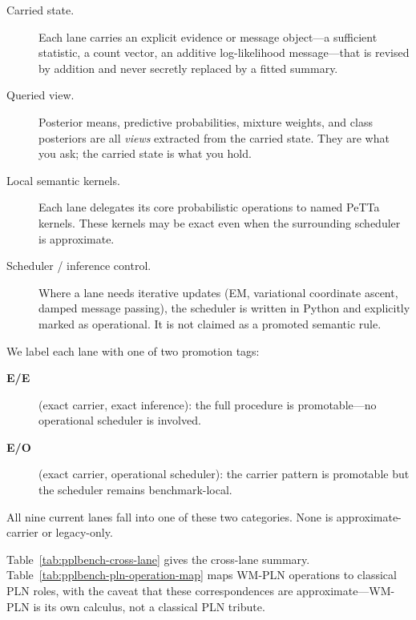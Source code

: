 \documentclass[11pt,openany]{report}
\begin{document}
\begin{description}
\item[Carried state.]
  Each lane carries an explicit evidence or message object---a sufficient
  statistic, a count vector, an additive log-likelihood message---that is
  revised by addition and never secretly replaced by a fitted summary.

\item[Queried view.]
  Posterior means, predictive probabilities, mixture weights, and class
  posteriors are all \emph{views} extracted from the carried state.
  They are what you ask; the carried state is what you hold.

\item[Local semantic kernels.]
  Each lane delegates its core probabilistic operations to named PeTTa
  kernels.  These kernels may be exact even when the surrounding scheduler
  is approximate.

\item[Scheduler / inference control.]
  Where a lane needs iterative updates (EM, variational coordinate ascent,
  damped message passing), the scheduler is written in Python and explicitly
  marked as operational.  It is not claimed as a promoted semantic rule.
\end{description}

\noindent
We label each lane with one of two promotion tags:
\begin{description}
\item[\textbf{E/E}] (exact carrier, exact inference):
  the full procedure is promotable---no operational scheduler is involved.
\item[\textbf{E/O}] (exact carrier, operational scheduler):
  the carrier pattern is promotable but the scheduler remains
  benchmark-local.
\end{description}
All nine current lanes fall into one of these two categories.  None is
approximate-carrier or legacy-only.

Table~\ref{tab:pplbench-cross-lane} gives the cross-lane summary.
Table~\ref{tab:pplbench-pln-operation-map} maps WM-PLN operations to
classical PLN roles, with the caveat that these correspondences are
approximate---WM-PLN is its own calculus, not a classical PLN tribute.
\end{document}

